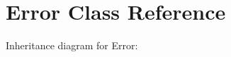 \hypertarget{class_error}{}\section{Error Class Reference}
\label{class_error}


Inheritance diagram for Error\+:
